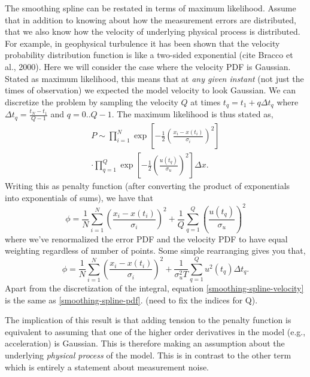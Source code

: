 \documentclass[twocol]{ametsoc}
\begin{document}
The smoothing spline can be restated in terms of maximum likelihood. Assume that in addition to knowing about how the measurement errors are distributed, that we also know how the velocity of underlying physical process is distributed. For example, in geophysical turbulence it has been shown that the velocity probability distribution function is like a two-sided exponential (cite Bracco et al., 2000). Here we will consider the case where the velocity PDF is Gaussian. Stated as maximum likelihood, this means that at \emph{any given instant} (not just the times of observation) we expected the model velocity to look Gaussian. We can discretize the problem by sampling the velocity $Q$ at times $t_q = t_1 + q \Delta t_q$ where $\Delta t_q=\frac{t_N-t_1}{Q-1}$ and $q=0..Q-1$. The maximum likelihood is thus stated as,
\begin{equation}
\label{gaussian-max-likelihood}
\begin{split}
P \sim \prod^N _{i=1}\exp \left[ -\frac{1}{2} \left( \frac{x_i - x(t_i)}{\sigma_i} \right)^2 \right] \\\cdot \prod^{Q}_{q=1} \exp \left[  - \frac{1}{2} \left(  \frac{u(t_q)}{\sigma_u} \right)^2 \right] \Delta x.
\end{split}
\end{equation}
Writing this as penalty function (after converting the product of exponentials into exponentials of sums), we have that
\begin{equation}
\phi =  \frac{1}{N} \sum^N _{i=1}\left( \frac{x_i - x(t_i)}{\sigma_i} \right)^2 + \frac{1}{Q} \sum^{Q}_{q=1}  \left(  \frac{u(t_q)}{\sigma_u} \right)^2
\end{equation}
where we've renormalized the error PDF and the velocity PDF to have equal weighting regardless of number of points. Some simple rearranging gives you that,
\begin{equation}
\label{smoothing-spline-pdf}
\phi = \frac{1}{N} \sum^N _{i=1}  \left( \frac{x_i - x(t_i)}{\sigma_i} \right)^2 + \frac{1}{\sigma_u^2 T} \sum^{Q}_{q=1}  u^2(t_q) \Delta t_q.
\end{equation}
Apart from the discretization of the integral, equation \ref{smoothing-spline-velocity} is the same as \ref{smoothing-spline-pdf}. (need to fix the indices for Q).

The implication of this result is that adding tension to the penalty function is equivalent to assuming that one of the higher order derivatives in the model (e.g., acceleration) is Gaussian. This is therefore making an assumption about the underlying \emph{physical process} of the model. This is in contrast to the other term which is entirely a statement about measurement noise.
\end{document}
